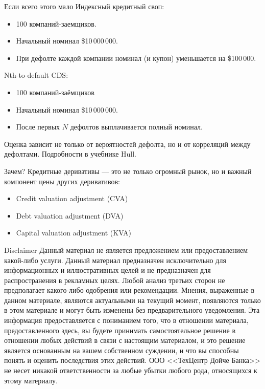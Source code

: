 \documentclass{beamer}
\newcommand{\insertdisclaimerframe}{
		\begin{frame}{Disclaimer}
			\small
			\justify
			Данный материал не является предложением или предоставлением
			какой-либо услуги. Данный материал предназначен исключительно для
			информационных и иллюстративных целей и не предназначен для
			распространения в рекламных целях. Любой анализ третьих сторон не 		
			предполагает какого-либо одобрения или рекомендации. Мнения, 
			выраженные в	данном материале, являются актуальными на текущий момент,
			появляются только в этом материале и могут быть изменены без 
			предварительного уведомления. Эта информация предоставляется с 
			пониманием того, что в отношении материала, предоставленного здесь, вы
			будете принимать самостоятельное решение в отношении любых действий в
			связи с настоящим материалом, и это решение является основанным на 
			вашем	собственном суждении, и что вы способны понять и оценить 
			последствия этих действий. ООО <<ТехЦентр Дойче Банка>> не несет 
			никакой ответственности за любые убытки любого рода, относящихся к
			 этому материалу.
		\end{frame}
	}
\newcommand{\insertdisclaimerframe}{
	}
\begin{document}
\begin{frame}{Если всего этого мало}
\justify
Индексный кредитный своп:
\begin{itemize}
\item 100 компаний-заемщиков.
\item Начальный номинал \$10\,000\,000.
\item При дефолте каждой компании номинал (и купон) уменьшается на \$100\,000.
\end{itemize}

Nth-to-default CDS:
\begin{itemize}
\item 100 компаний-заёмщиков
\item Начальный номинал \$10\,000\,000.
\item После первых $N$ дефолтов выплачивается полный номинал.
\end{itemize}
Оценка зависит не только от вероятностей дефолта, но и от корреляций между дефолтами. Подробности в учебнике Hull.
\end{frame}



\begin{frame}{Зачем?}
\justify
Кредитные деривативы --- это не только огромный рынок, но и важный компонент цены других деривативов:
\begin{itemize}
\item Credit valuation adjustment (CVA)
\item Debt valuation adjustment (DVA)
\item Capital valuation adjustment (KVA)
\end{itemize}
\end{frame}


\insertdisclaimerframe
\end{document}
